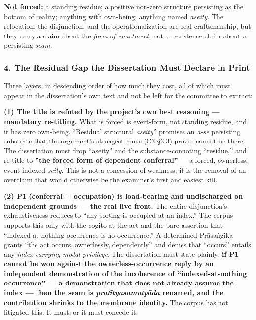 \documentclass[11pt]{article}
\begin{document}
\textbf{Not forced:} a standing residue; a positive non-zero structure persisting as the bottom of reality; anything with own-being; anything named \emph{aseity}. The relocation, the disjunction, and the operationalization are real craftsmanship, but they carry a claim about the \emph{form of enactment}, not an existence claim about a persisting \emph{seam}.

\subsubsection*{4. The Residual Gap the Dissertation Must Declare in Print}

Three layers, in descending order of how much they cost, all of which must appear in the dissertation's own text and not be left for the committee to extract:

\textbf{(1) The title is refuted by the project's own best reasoning — mandatory re-titling.} What is forced is event-form, not standing residue, and it has zero own-being. ``Residual structural \emph{aseity}'' promises an \emph{a-se} persisting substrate that the argument's strongest move (C3 §3.3) proves cannot be there. The dissertation must drop ``aseity'' and the substance-connoting ``residue,'' and re-title to \textbf{''the forced form of dependent conferral''} — a forced, ownerless, event-indexed \emph{seity}. This is not a concession of weakness; it is the removal of an overclaim that would otherwise be the examiner's first and easiest kill.

\textbf{(2) P1 (conferral = occupation) is load-bearing and undischarged on independent grounds — the real live front.} The entire disjunction's exhaustiveness reduces to ``any sorting is occupied-at-an-index.'' The corpus supports this only with the cogito-at-the-act and the bare assertion that ``indexed-at-nothing occurrence is no occurrence.'' A determined Prāsaṅgika grants ``the act occurs, ownerlessly, dependently'' and denies that ``occurs'' entails any \emph{index carrying modal privilege}. The dissertation must state plainly: \textbf{if P1 cannot be won against the ownerless-occurrence reply by an independent demonstration of the incoherence of ``indexed-at-nothing occurrence'' — a demonstration that does not already assume the index — then the seam is \emph{pratītyasamutpāda} renamed, and the contribution shrinks to the membrane identity.} The corpus has not litigated this. It must, or it must concede it.
\end{document}

